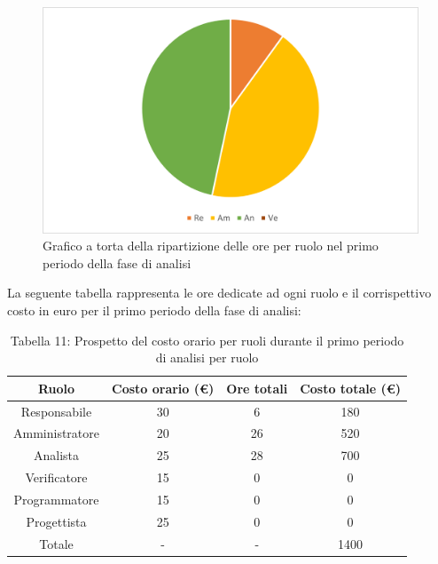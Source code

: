 \begin{figure}[H]
    \centering
    \includegraphics[scale=0.6]{img/grafi preventivo/torta/analisi/periodo1.png}
    \caption{Grafico a torta della ripartizione delle ore per ruolo nel primo periodo della fase di analisi}
\end{figure}
La seguente tabella rappresenta le ore dedicate ad ogni ruolo e il corrispettivo costo in euro per il primo periodo della fase di analisi:
\begin{table}[h]
	\setlength\extrarowheight{5pt}
	\centering
	\begin{tabularx}{\textwidth}{|ccc|c|}
		\hline
		\rowcolor{white}
		\textbf{Ruolo} & \textbf{Costo orario (€)} & \textbf{Ore totali} & \textbf{Costo totale (€)} \\
		\hline
		Responsabile &30&6&180 \\
		Amministratore &20&26&520 \\
		Analista &25&28&700 \\
		Verificatore &15&0&0 \\
		Programmatore &15&0&0 \\
		Progettista &25&0&0 \\
		\hline
		Totale &-&-&1400 \\
		\hline
	\end{tabularx}
    \vspace{10pt}
	\caption{Tabella 11: Prospetto del costo orario per ruoli durante il primo periodo di analisi per ruolo}
\end{table}
